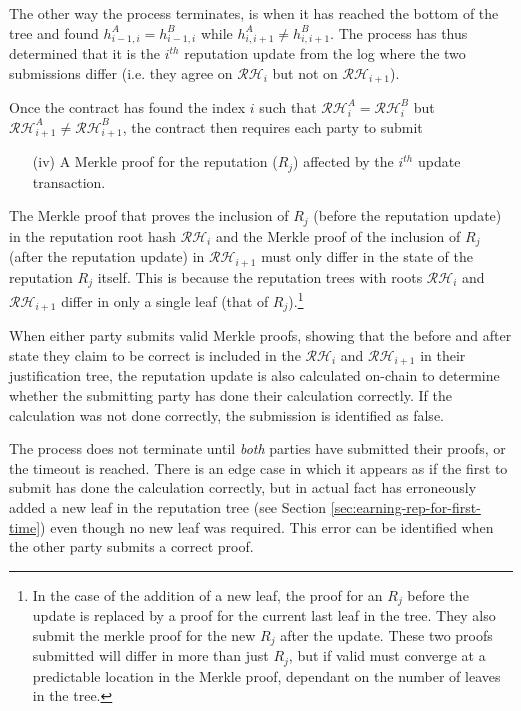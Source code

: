 The other way the process terminates, is when it has reached the bottom of the tree and found $h_{i-1,i}^A = h_{i-1,i}^B$ while $h_{i,i+1}^A \neq h_{i,i+1}^B$. The process has thus determined that it is the $i^{th}$ reputation update from the log where the two submissions differ (i.e. they agree on $\mathcal{RH}_{i}$ but not on $\mathcal{RH}_{i+1}$).

Once the contract has found the index $i$ such that $\mathcal{RH}^A_{i}=\mathcal{RH}^B_{i}$ but $\mathcal{RH}^A_{i+1}\neq\mathcal{RH}^B_{i+1}$, the contract then requires each party to submit
\begin{itemize}
 \item[(iv)] A Merkle proof for the reputation ($R_j$) affected by the $i^{th}$ update transaction.
\end{itemize}

The Merkle proof that proves the inclusion of $R_j$ (before the reputation update) in the reputation root hash $\mathcal{RH}_{i}$ and the Merkle proof of the inclusion of $R_j$ (after the reputation update) in $\mathcal{RH}_{i+1}$ must only differ in the state of the reputation $R_j$ itself. This is because the reputation trees with roots $\mathcal{RH}_{i}$ and $\mathcal{RH}_{i+1}$ differ in only a single leaf (that of $R_j$).\footnote{In the case of the addition of a new leaf, the proof for an $R_j$ before the update is replaced by a proof for the current last leaf in the tree. They also submit the merkle proof for the new $R_j$ after the update. These two proofs submitted will differ in more than just $R_j$, but if valid must converge at a predictable location in the Merkle proof, dependant on the number of leaves in the tree. }

When either party submits valid Merkle proofs, showing that the before and after state they claim to be correct is included in the $\mathcal{RH}_{i}$ and $\mathcal{RH}_{i+1}$ in their justification tree, the reputation update is also calculated on-chain to determine whether the submitting party has done their calculation correctly. If the calculation was not done correctly, the submission is identified as false.

The process does not terminate until \emph{both} parties have submitted their proofs, or the timeout is reached. There is an edge case in which it appears as if the first to submit has done the calculation correctly, but in actual fact has erroneously added a new leaf in the reputation tree (see Section \ref{sec:earning-rep-for-first-time}) even though no new leaf was required. This error can be identified when the other party submits a correct proof.

